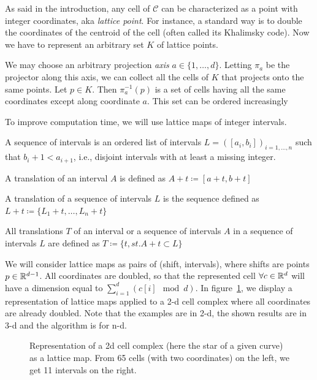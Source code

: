 As said in the introduction, any cell of $\mathcal{C}$ can be
characterized as a point with integer coordinates, aka \emph{lattice
point}. For instance, a standard way is to double the coordinates of
the centroid of the cell (often called its Khalimsky code). Now we
have to represent an arbitrary set $K$ of lattice points.

We may choose an arbitrary projection \emph{axis} $a \in
\{1,\ldots,d\}$. Letting $\pi_a$ be the projector along this axis, we
can collect all the cells of $K$ that projects onto the same
points. Let $p \in K$. Then $\pi^{-1}_a(p)$ is a set of cells having
all the same coordinates except along coordinate $a$. This set can be ordered increasingly

To improve computation time, we will use lattice maps of integer
intervals.

\begin{definition}
  A sequence of intervals is an ordered list of intervals $L = ([a_i,b_i])_{i=1,\ldots,n}$ such that $b_i + 1 < a_{i+1}$, i.e., disjoint intervals with at least a missing integer.
\end{definition}

\begin{definition}
  A translation of an interval $A$ is defined as $A+t \coloneqq [a+t, b+t]$
\end{definition}

\begin{definition}
  A translation of a sequence of intervals $L$ is the sequence defined as $L+t \coloneqq \{L_1+t,\ldots,L_n+t\}$
\end{definition}

\begin{definition}
  All translations $T$ of an interval or a sequence of intervals $A$ in a sequence of intervals $L$ are defined as $ T \coloneqq \{ t, st. A+t \subset L\}$
\end{definition}

We will consider lattice maps as pairs of (shift, intervals), where shifts are points $p \in \mathbb{R}^{d-1}$. All coordinates are doubled, so that the represented cell $\forall c \in \mathbb{R}^d$ will have a dimension equal to $\sum_{i=1}^d \left(c[i]\mod d\right)$.
In figure~\ref{fig:lattice-representation}, we display a representation of lattice maps applied to a 2-d cell complex where all coordinates are already doubled. Note that the examples are in 2-d, the shown results are in 3-d and the algorithm is for n-d.

\begin{figure}
  \centering
  
  \caption{\label{fig:lattice-representation} Representation of a
    2d cell complex (here the star of a given curve) as a lattice
    map. From 65 cells (with two coordinates) on the left, we get 11
    intervals on the right.}
\end{figure}

